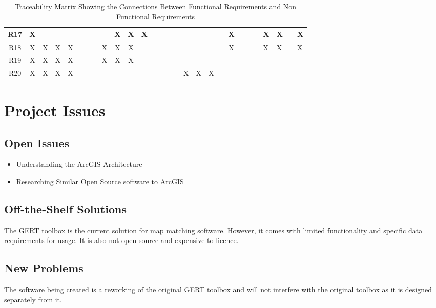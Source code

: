 \documentclass[12pt, titlepage]{article}
\begin{document}
\begin{landscape}
\begin{table}[H]
{\begin{tabular}{|c|c|c|c|c|c|c|c|c|c|c|c|c|c|c|c|c|c|c|c|c|}
R17 & X& & & & & & & & X& X& X& & & & & & & & &X & & & &X &X & &X \\ \hline
R18 & X& X& X& X& & & & X& X& X& & & & & & & & & &X & & & &X &X & &X \\ \hline
\sout{R19} & \sout{X}& \sout{X}& \sout{X}& \sout{X}& & & & \sout{X}& \sout{X}& \sout{X}& & & & & & & & & \\ \hline
\sout{R20} & \sout{X}& \sout{X}& \sout{X}& \sout{X}& & & & & & & & & & & & \sout{X}& \sout{X}& \sout{X}& \\ \hline
\hline
\end{tabular}
}
\caption{Traceability Matrix Showing the Connections Between Functional Requirements and Non Functional Requirements}
\label{Table:trace}
\end{table}
\end{landscape}

\section{Project Issues}

\subsection{Open Issues}
\begin{itemize}
    \item Understanding the ArcGIS Architecture 
    \item Researching Similar Open Source software to ArcGIS
\end{itemize}

\subsection{Off-the-Shelf Solutions}
The GERT toolbox is the current solution for map matching software. However, it comes with limited functionality and specific data requirements for usage. It is also not open source and expensive to licence. 
\subsection{New Problems}
The software being created is a reworking of the original GERT toolbox and will not interfere with the original toolbox as it is designed separately from it.
\end{document}

